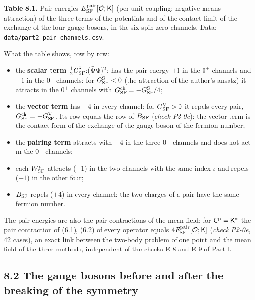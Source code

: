 \documentclass[
  10pt,
]{article}
\providecommand{\tightlist}{%
  \setlength{\itemsep}{0pt}\setlength{\parskip}{0pt}}
\begin{document}
\textbf{Table 8.1.} Pair energies
\(E^{\rm pair}_{\rm SF}[\mathcal O;\mathsf K]\) (per unit coupling;
negative means attraction) of the three terms of the potentials and of
the contact limit of the exchange of the four gauge bosons, in the six
spin-zero channels. Data: \texttt{data/part2\_pair\_channels.csv}.

What the table shows, row by row:

\begin{itemize}
\tightlist
\item
  the \textbf{scalar term}
  \(\tfrac12G^{\rm S}_{\rm SF}{:}(\bar\Psi\Psi)^2{:}\) has the pair
  energy \(+1\) in the \(0^+\) channels and \(-1\) in the \(0^-\)
  channels: for \(G^{\rm S}_{\rm SF}<0\) (the attraction of the author's
  ansatz) it attracts in the \(0^+\) channels with
  \(G^{\rm ch}_{\rm SF}=-G^{\rm S}_{\rm SF}/4\);
\item
  the \textbf{vector term} has \(+4\) in every channel: for
  \(G^{\rm V}_{\rm SF}>0\) it repels every pair,
  \(G^{\rm ch}_{\rm SF}=-G^{\rm V}_{\rm SF}\). Its row equals the row of
  \(B_{\rm SF}\) (\emph{check P2-0c}): the vector term is the contact
  form of the exchange of the gauge boson of the fermion number;
\item
  the \textbf{pairing term} attracts with \(-4\) in the three \(0^+\)
  channels and does not act in the \(0^-\) channels;
\item
  each \textbf{\(W^\iota_{\rm SF}\)} attracts (\(-1\)) in the two
  channels with the same index \(\iota\) and repels (\(+1\)) in the
  other four;
\item
  \textbf{\(B_{\rm SF}\)} repels (\(+4\)) in every channel: the two
  charges of a pair have the same fermion number.
\end{itemize}

The pair energies are also the pair contractions of the mean field: for
\(\mathsf C^{\rm p}=\mathsf K^*\) the pair contraction of (6.1), (6.2)
of every operator equals
\(4E^{\rm pair}_{\rm SF}[\mathcal O;\mathsf K]\) (\emph{check P2-0e}, 42
cases), an exact link between the two-body problem of one point and the
mean field of the three methods, independent of the checks E-8 and E-9
of Part I.

\hypertarget{the-gauge-bosons-before-and-after-the-breaking-of-the-symmetry}{%
\subsection{8.2 The gauge bosons before and after the breaking of the
symmetry}\label{the-gauge-bosons-before-and-after-the-breaking-of-the-symmetry}}
\end{document}
